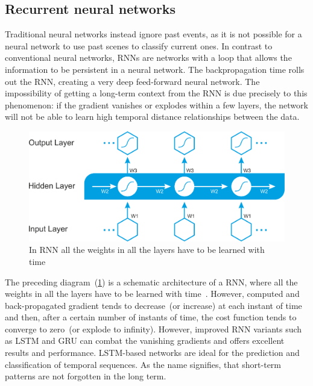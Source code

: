 \subsection{Recurrent neural networks}
Traditional neural networks instead ignore past events, as it is not possible for a neural network to use past scenes to classify current ones. In contrast to conventional neural networks, RNNs are networks with a loop that allows the information to be persistent in a neural network. The backpropagation time rolls out the RNN, creating a very deep feed-forward neural network. The impossibility of getting a long-term context from the RNN is due precisely to this phenomenon: if the gradient vanishes or explodes within a few layers, the network will not be able to learn high temporal distance relationships between the data. 

\begin{figure}[h]
    \centering
    \includegraphics[scale=0.3]{images/B09698_06_4.png}
    \caption[In RNN all the weights in all the layers have to be learned with time]{In RNN all the weights in all the layers have to be learned with time~\cite{karimDLTF2018}}
    \label{fig:rnn_theory1}
    \vspace{-2mm}
\end{figure}

\hspace*{3.5mm} The preceding diagram~(\cref{fig:rnn_theory1}) is a schematic architecture of a RNN, where all the weights in all the layers have to be learned with time~\cite{karimDLTF2018}. However, computed and back-propagated gradient tends to decrease~(or increase) at each instant of time and then, after a certain number of instants of time, the cost function tends to converge to zero~(or explode to infinity). However, improved RNN variants such as LSTM and GRU can combat the vanishing gradients and offers excellent results and performance. LSTM-based networks are ideal for the prediction and classification of temporal sequences. As the name signifies, that short-term patterns are not forgotten in the long term. 

